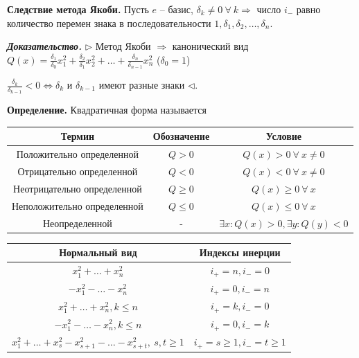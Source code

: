 \bigskip
\textbf{Следствие метода Якоби.} Пусть $e$ -- базис, $\delta_k \neq 0 \ \forall \ k \Rightarrow$ число $i_-$ равно количество перемен знака в последовательности $1, \delta_1, \delta_2, \dots, \delta_n$.

\bigskip
\textbf{\textit{Доказательство.}} $\rhd$ Метод Якоби $\Rightarrow$ канонический вид $Q(x) = \frac{\delta_1}{\delta_0} x_1^2 + \frac{\delta_2}{\delta_1} x_2^2 + \dots + \frac{\delta_n}{\delta_{n-1}} x_n^2$ ($\delta_0 = 1$)

$\frac{\delta_k}{\delta_{k-1}} < 0 \Leftrightarrow \delta_k$ и $\delta_{k-1}$ имеют разные знаки $\lhd$.

\bigskip
\textbf{Определение.} Квадратичная форма называется 

\bigskip
\begin{center}
		\begin{tabular}{c|c|c}
    	Термин & Обозначение & Условие   \\
        \hline
        Положительно определенной & $Q > 0$ & $Q(x) > 0 \ \forall \ x \neq 0$ \\
        Отрицательно определенной & $Q < 0$ & $Q(x) < 0 \ \forall \ x \neq 0$ \\
        Неотрицательно определенной & $Q \geq 0$ & $Q(x) \geq 0 \ \forall \ x$ \\
        Неположительно определенной & $Q \leq 0$ & $Q(x) \leq 0 \ \forall \ x$ \\
        Неопределенной & - & $\exists x: Q(x) > 0, \exists y: Q(y) < 0$ 
        
		\end{tabular}
\end{center}
\begin{center}
		\begin{tabular}{c|c}
    	Нормальный вид & Индексы инерции   \\
        \hline
        $x_1^2 + \dots + x_n^2$ & $i_+ = n, i_- = 0$ \\
        $-x_1^2 - \dots - x_n^2$ & $i_+ = 0, i_- = n$ \\
        $x_1^2 + \dots + x_n^2, k \leq n$ & $i_+ = k, i_- = 0$ \\
        $-x_1^2 - \dots - x_n^2, k \leq n$ & $i_+ = 0, i_- = k$ \\
        $x_1^2 + \dots + x_s^2 - x_{s+1}^2 - \dots - x_{s+t}^2, \ s, t \geq 1$ & $i_+ = s \geq 1, i_- = t \geq 1$ 
		\end{tabular}
\end{center}

